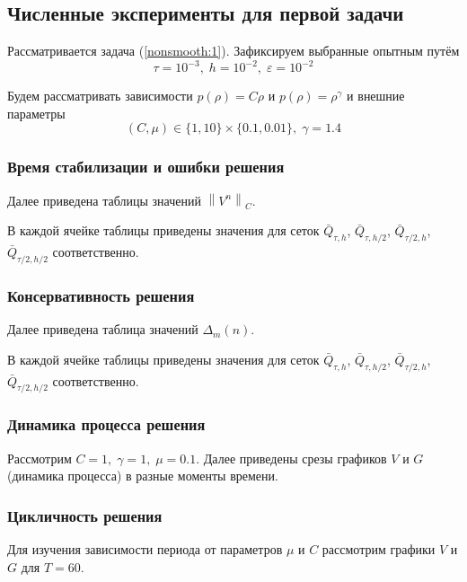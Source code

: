 \subsection{Численные эксперименты для первой задачи}

Рассматривается задача (\ref{nonsmooth:1}).
Зафиксируем выбранные опытным путём
$$ \tau = 10^{-3}, \; h = 10^{-2}, \; \varepsilon = 10^{-2}$$

Будем рассматривать зависимости 
$ p(\rho) = C \rho $ и $p(\rho) = \rho^{\gamma}$
и внешние параметры 
$$ (C, \mu) \in \{1, 10\} \times \{0.1, 0.01\}, \; \gamma = 1.4$$


\subsubsection{Время стабилизации и ошибки решения}
Далее приведена таблицы значений $\left\|V^{n}\right\|_C$. 

В каждой ячейке таблицы приведены значения для сеток
$ \bar Q_{\tau, h} $, $ \bar Q_{\tau, h/2} $, 
$ \bar Q_{\tau/2, h} $, $ \bar Q_{\tau/2, h/2} $ соответственно.


\newpage



\subsubsection{Консервативность решения}
Далее приведена таблица значений $\Delta_{m}(n)$. 

В каждой ячейке таблицы приведены значения для сеток
$ \bar Q_{\tau, h} $, $ \bar Q_{\tau, h/2} $, 
$ \bar Q_{\tau/2, h} $, $ \bar Q_{\tau/2, h/2} $ соответственно.


\newpage



\subsubsection{Динамика процесса решения}
Рассмотрим $C = 1, \; \gamma = 1, \; \mu = 0.1$.
Далее приведены срезы графиков $V$ и $G$ (динамика процесса) в разные моменты времени.



\subsubsection{Цикличность решения}
Для изучения зависимости периода от параметров $\mu$ и $C$ 
рассмотрим графики $V$ и $G$ для $T = 60$.

